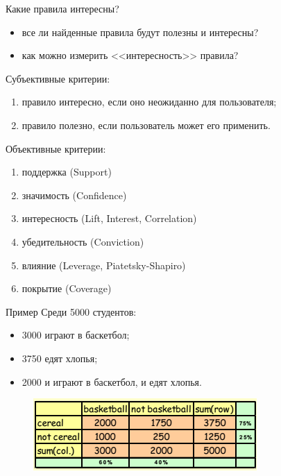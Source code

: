 \documentclass{beamer}
\begin{document}
\begin{frame}[t]{Какие правила интересны?}
	\begin{itemize}
		\item все ли найденные правила будут полезны и интересны?
		\item как можно измерить <<интересность>> правила?
	\end{itemize}

	Субъективные критерии:
	\begin{enumerate}
		\item правило интересно, если оно неожиданно для пользователя;
		\item правило полезно, если пользователь может его применить.
	\end{enumerate}

	Объективные критерии:
	\begin{enumerate}
		\item поддержка (Support)
		\item значимость (Confidence)
		\item интересность (Lift, Interest, Correlation) 
		\item убедительность (Conviction)
		\item влияние (Leverage, Piatetsky-Shapiro)
		\item покрытие (Coverage)	
	\end{enumerate}
\end{frame}

\begin{frame}{Пример}
	Среди 5000 студентов:
	\begin{itemize}
		\item 3000 играют в баскетбол;
		\item 3750 едят хлопья;
		\item 2000 и играют в баскетбол, и едят хлопья.					
	\end{itemize}

	

	
	\begin{figure}[h]
		\centering
		\includegraphics[scale=1]{images/lec08-pic21.png}
	\end{figure}
\end{frame}
\end{document}
